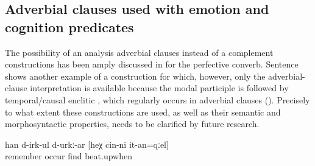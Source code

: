 \subsection{Adverbial clauses used with emotion and cognition predicates}
\label{ssec:Nominalized relative clauses used with emotion and cognition predicates}
The possibility of an analysis adverbial clauses instead of a complement constructions has been amply discussed in  for the perfective converb. Sentence  shows another example of a construction for which, however, only the adverbial-clause interpretation is available because the modal participle is followed by temporal/causal enclitic  , which regularly occurs in adverbial clauses (). Precisely to what extent these constructions are used, as well as their semantic and morphosyntactic properties, needs to be clarified by future research.


\begin{exe}
	\ex	\label{ex:‎He is probably remembering when he was beaten}
	\gll	han	d-irk-ul	d-urkː-ar	[heχ	cin-ni	it-an=qːel]\\
		remember	occur	find			beat.upwhen\\
	\glt	{}
\end{exe}

